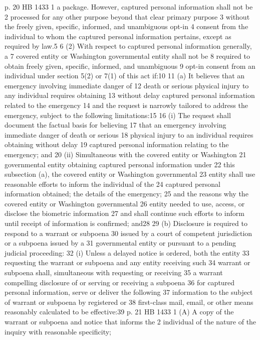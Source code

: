 p. 20 HB 1433
1 a package. However, captured personal information shall not be
2 processed for any other purpose beyond that clear primary purpose
3 without the freely given, specific, informed, and unambiguous opt-in
4 consent from the individual to whom the captured personal information
pertains, except as required by law.5
6 (2) With respect to captured personal information generally, a
7 covered entity or Washington governmental entity shall not be
8 required to obtain freely given, specific, informed, and unambiguous
9 opt-in consent from an individual under section 5(2) or 7(1) of this
act if:10
11 (a) It believes that an emergency involving immediate danger of
12 death or serious physical injury to any individual requires obtaining
13 without delay captured personal information related to the emergency
14 and the request is narrowly tailored to address the emergency,
subject to the following limitations:15
16 (i) The request shall document the factual basis for believing
17 that an emergency involving immediate danger of death or serious
18 physical injury to an individual requires obtaining without delay
19 captured personal information relating to the emergency; and
20 (ii) Simultaneous with the covered entity or Washington
21 governmental entity obtaining captured personal information under
22 this subsection (a), the covered entity or Washington governmental
23 entity shall use reasonable efforts to inform the individual of the
24 captured personal information obtained; the details of the emergency;
25 and the reasons why the covered entity or Washington governmental
26 entity needed to use, access, or disclose the biometric information
27 and shall continue such efforts to inform until receipt of
information is confirmed; and28
29 (b) Disclosure is required to respond to a warrant or subpoena
30 issued by a court of competent jurisdiction or a subpoena issued by a
31 governmental entity or pursuant to a pending judicial proceeding:
32 (i) Unless a delayed notice is ordered, both the entity
33 requesting the warrant or subpoena and any entity receiving such
34 warrant or subpoena shall, simultaneous with requesting or receiving
35 a warrant compelling disclosure of or serving or receiving a subpoena
36 for captured personal information, serve or deliver the following
37 information to the subject of warrant or subpoena by registered or
38 first-class mail, email, or other means reasonably calculated to be
effective:39
p. 21 HB 1433
1 (A) A copy of the warrant or subpoena and notice that informs the
2 individual of the nature of the inquiry with reasonable specificity;
